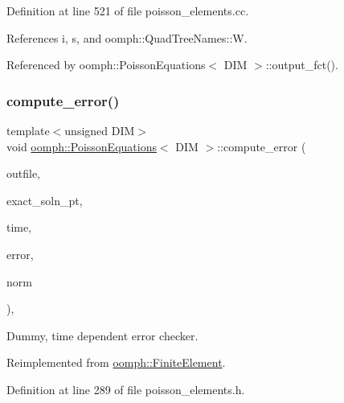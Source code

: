 Definition at line 521 of file poisson\+\_\+elements.\+cc.



References i, s, and oomph\+::\+Quad\+Tree\+Names\+::W.



Referenced by oomph\+::\+Poisson\+Equations$<$ D\+I\+M $>$\+::output\+\_\+fct().

\mbox{\label{classoomph_1_1PoissonEquations_a529901bcc5464c599fb0155619e56ed2}} 
\subsubsection{\texorpdfstring{compute\+\_\+error()}{compute\_error()}\hspace{0.1cm}{\footnotesize\ttfamily [2/2]}}
{\footnotesize\ttfamily template$<$unsigned D\+IM$>$ \\
void \hyperlink{classoomph_1_1PoissonEquations}{oomph\+::\+Poisson\+Equations}$<$ D\+IM $>$\+::compute\+\_\+error (\begin{DoxyParamCaption}\item[{std\+::ostream \&}]{outfile,  }\item[{\hyperlink{classoomph_1_1FiniteElement_ad4ecf2b61b158a4b4d351a60d23c633e}{Finite\+Element\+::\+Unsteady\+Exact\+Solution\+Fct\+Pt}}]{exact\+\_\+soln\+\_\+pt,  }\item[{const double \&}]{time,  }\item[{double \&}]{error,  }\item[{double \&}]{norm }\end{DoxyParamCaption})\hspace{0.3cm}{\ttfamily [inline]}, {\ttfamily [virtual]}}



Dummy, time dependent error checker. 



Reimplemented from \hyperlink{classoomph_1_1FiniteElement_a7f67853506dc73fa6b7505108de22d1f}{oomph\+::\+Finite\+Element}.



Definition at line 289 of file poisson\+\_\+elements.\+h.

\mbox{\label{classoomph_1_1PoissonEquations_a44cc8368f1e4008997908134300ab13f}} 
